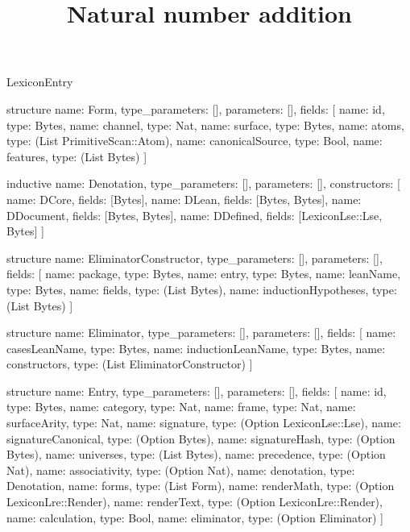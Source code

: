 \begin{lexlean}{LexiconEntry}
\title{Natural number addition}
\begin{semanticmodule}
structure{
  name: Form,
  type_parameters: [],
  parameters: [],
  fields: [
    {name: id, type: Bytes},
    {name: channel, type: Nat},
    {name: surface, type: Bytes},
    {name: atoms, type: (List PrimitiveScan::Atom)},
    {name: canonicalSource, type: Bool},
    {name: features, type: (List Bytes)}
  ]
}

inductive{
  name: Denotation,
  type_parameters: [],
  parameters: [],
  constructors: [
    {name: DCore, fields: [Bytes]},
    {name: DLean, fields: [Bytes, Bytes]},
    {name: DDocument, fields: [Bytes, Bytes]},
    {name: DDefined, fields: [LexiconLse::Lse, Bytes]}
  ]
}

structure{
  name: EliminatorConstructor,
  type_parameters: [],
  parameters: [],
  fields: [
    {name: package, type: Bytes},
    {name: entry, type: Bytes},
    {name: leanName, type: Bytes},
    {name: fields, type: (List Bytes)},
    {name: inductionHypotheses, type: (List Bytes)}
  ]
}

structure{
  name: Eliminator,
  type_parameters: [],
  parameters: [],
  fields: [
    {name: casesLeanName, type: Bytes},
    {name: inductionLeanName, type: Bytes},
    {name: constructors, type: (List EliminatorConstructor)}
  ]
}

structure{
  name: Entry,
  type_parameters: [],
  parameters: [],
  fields: [
    {name: id, type: Bytes},
    {name: category, type: Nat},
    {name: frame, type: Nat},
    {name: surfaceArity, type: Nat},
    {name: signature, type: (Option LexiconLse::Lse)},
    {name: signatureCanonical, type: (Option Bytes)},
    {name: signatureHash, type: (Option Bytes)},
    {name: universes, type: (List Bytes)},
    {name: precedence, type: (Option Nat)},
    {name: associativity, type: (Option Nat)},
    {name: denotation, type: Denotation},
    {name: forms, type: (List Form)},
    {name: renderMath, type: (Option LexiconLre::Render)},
    {name: renderText, type: (Option LexiconLre::Render)},
    {name: calculation, type: Bool},
    {name: eliminator, type: (Option Eliminator)}
  ]
}


\end{semanticmodule}
\end{lexlean}
